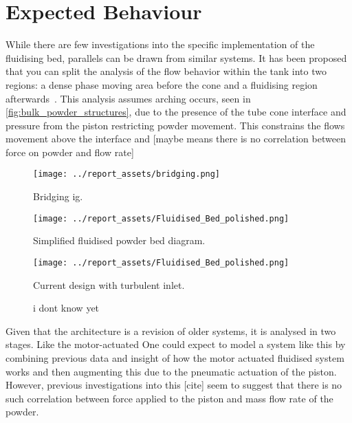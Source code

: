 \section{Expected Behaviour}
While there are few investigations into the specific implementation of the fluidising bed, parallels can be drawn from similar systems. It has been proposed that you can split the analysis of the flow behavior within the tank into two regions: a dense phase moving area before the cone and a fluidising region afterwards~\cite{Tang22}. This analysis assumes arching occurs, seen in \autoref{fig:bulk_powder_structures}, due to the presence of the tube cone interface and pressure from the piston restricting powder movement. This constrains the flows movement above the interface and [maybe means there is no correlation between force on powder and flow rate]
\begin{figure}[htbp]
    \centering

    \begin{minipage}{0.3\textwidth}
        \centering
        \texttt{[image: ../report\_assets/bridging.png]}
        \caption{Bridging ig\cite{911Metallurgist_binsflow}.}
    \end{minipage}
    \hfill
    \begin{minipage}{0.3\textwidth}
        \centering
        \texttt{[image: ../report\_assets/Fluidised\_Bed\_polished.png]}
        \caption{Simplified fluidised powder bed diagram.}
    \end{minipage}
    \hfill
    \begin{minipage}{0.3\textwidth}
        \centering
        \texttt{[image: ../report\_assets/Fluidised\_Bed\_polished.png]}
        \caption{Current design with turbulent inlet.}
    \end{minipage}
    \caption{i dont know yet}\label{fig:idknowyet}
\end{figure}
Given that the architecture is a revision of older systems, it is analysed in two stages. Like the motor-actuated 
One could expect to model a system like this by combining previous data and insight of how the motor actuated fluidised system works and then augmenting this due to the pneumatic actuation of the piston. However, previous investigations into this [cite] seem to suggest that there is no such correlation between force applied to the piston and mass flow rate of the powder. 

